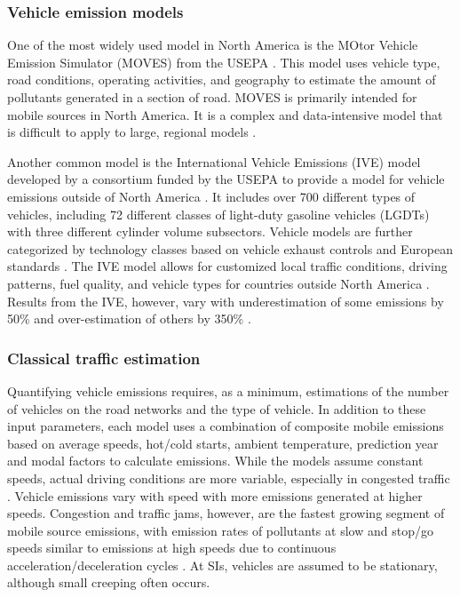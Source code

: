 \subsubsection{Vehicle emission models} \label{sssec:VehEmissionModels}

One of the most widely used model in North America is the MOtor Vehicle Emission Simulator (MOVES) from the USEPA \citep{MOVES2014a}. This model uses vehicle type, road conditions, operating activities, and geography to estimate the amount of pollutants generated in a section of road. MOVES is primarily intended for mobile sources in North America. It is a complex and data-intensive model that is difficult to apply to large, regional models \citep{Zhang2011}.

Another common model is the International Vehicle Emissions (IVE) model developed by a consortium funded by the USEPA to provide a model for vehicle emissions outside of North America \citep{IVE2008}. It includes over 700 different types of vehicles, including 72 different classes of light-duty gasoline vehicles (LGDTs) with three different cylinder volume subsectors. Vehicle models are further categorized by technology classes based on vehicle exhaust controls and European standards \citep{Davis2005}. The IVE model allows for customized local traffic conditions, driving patterns, fuel quality, and vehicle types for countries outside North America \citep{Davis2010}. Results from the IVE, however, vary with underestimation of some emissions by 50\% and over-estimation of others by 350\% \citep{Hui2007}.

\subsubsection{Classical traffic estimation} \label{sssec:ClassicalTraffic}

Quantifying vehicle emissions requires, as a minimum, estimations of the number of vehicles on the road networks and the type of vehicle. In addition to these input parameters, each model uses a combination of composite mobile emissions based on average speeds, hot/cold starts, ambient temperature, prediction year and modal factors to calculate emissions\citep{Franco2013}. While the models assume constant speeds, actual driving conditions are more variable, especially in congested traffic \citep{Freeman2015b}. Vehicle emissions vary with speed with more emissions generated at higher speeds. Congestion and traffic jams, however, are the fastest growing segment of mobile source emissions, with emission rates of pollutants at slow and stop/go speeds similar to emissions at high speeds due to continuous acceleration/deceleration cycles \citep{Barth2009}. At SIs, vehicles are assumed to be stationary, although small creeping often occurs.

